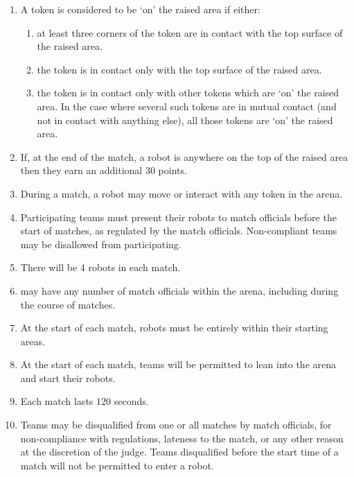 \begin{enumerate}
\begin{enumerate}
    \end{enumerate}
  \item A token is considered to be `on' the raised area if either:
    \begin{enumerate}
      \item at least three corners of the token are in contact with the top
            surface of the raised area.
      \item the token is in contact only with the top surface of the raised area.
      \item the token is in contact only with other tokens which are `on' the raised area.
            In the case where several such tokens are in mutual contact (and not in
            contact with anything else), all those tokens are `on' the raised area.
    \end{enumerate}
  \item If, at the end of the match, a robot is anywhere on the top of the
        raised area then they earn an additional 30 points.
  \item During a match, a robot may move or interact with any token in the arena.
  \item Participating teams must present their robots to match officials before
        the start of matches, as regulated by the match officials. Non-compliant
        teams may be disallowed from participating.
  \item There will be 4 robots in each match.
  \item \org may have any number of match officials within the arena, including
        during the course of matches.
  \item At the start of each match, robots must be entirely within their
        starting areas.
  \item At the start of each match, teams will be permitted to lean into the
        arena and start their robots.
  \item Each match lasts $120$ seconds.
  \item Teams may be disqualified from one or all matches by match officials,
        for non-compliance with regulations, lateness to the match, or any other
        reason at the discretion of the judge. Teams disqualified before the
        start time of a match will not be permitted to enter a robot.
\end{enumerate}
